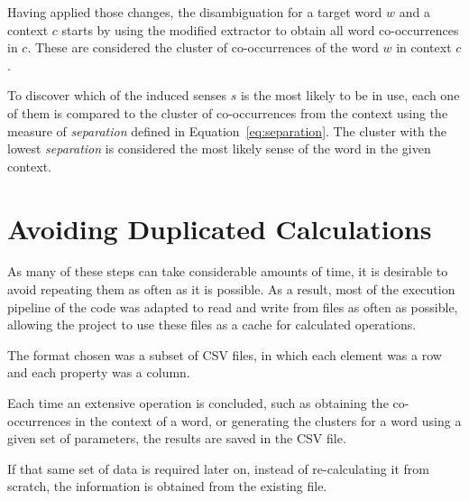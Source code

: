Having applied those changes, the disambiguation for a target word $w$ and a
context $c$ starts by using the modified extractor to obtain all word 
co-occurrences in $c$. These are considered the cluster of co-occurrences of the
word $w$ in context $c$.

To discover which of the induced senses $s$ is the most likely to be in use,
each one of them is compared to the cluster of co-occurrences from the context
using the measure of \emph{separation} defined in Equation~\ref{eq:separation}.
The cluster with the lowest \emph{separation} is considered the most likely
sense of the word in the given context.

\section{Avoiding Duplicated Calculations}

As many of these steps can take considerable amounts of time, it is desirable to
avoid repeating them as often as it is possible. As a result, most of the
execution pipeline of the code was adapted to read and write from files as often
as possible, allowing the project to use these files as a cache for calculated
operations.

The format chosen was a subset of \ac{CSV} files, in which each element was a
row and each property was a column.

Each time an extensive operation is concluded, such as obtaining the
co-occurrences in the context of a word, or generating the clusters for a
word using a given set of parameters, the results are saved in the CSV file.

If that same set of data is required later on, instead of re-calculating it
from scratch, the information is obtained from the existing file.

